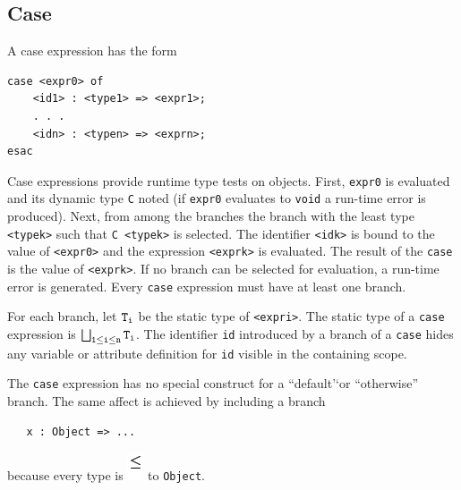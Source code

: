\documentclass[]{article}
\begin{document}
\subsection{Case}

A case expression has the form

\begin{verbatim}
case <expr0> of 
    <id1> : <type1> => <expr1>; 
    . . .
    <idn> : <typen> => <exprn>; 
esac
\end{verbatim}

Case expressions provide runtime type tests on objects. First,
\texttt{expr0} is evaluated and its dynamic type \texttt{C} noted (if
\texttt{expr0} evaluates to \texttt{void} a run-time error is produced).
Next, from among the branches the branch with the least type
\texttt{\textless{}typek\textgreater{}} such that
\texttt{C  \textless{}typek\textgreater{}} is selected. The identifier
\texttt{\textless{}idk\textgreater{}} is bound to the value of
\texttt{\textless{}expr0\textgreater{}} and the expression
\texttt{\textless{}exprk\textgreater{}} is evaluated. The result of the
\texttt{case} is the value of \texttt{\textless{}exprk\textgreater{}}.
If no branch can be selected for evaluation, a run-time error is
generated. Every \texttt{case} expression must have at least one branch.

For each branch, let $\tt T_i$ be the static type of
\texttt{\textless{}expri\textgreater{}}. The static type of a
\texttt{case} expression is $\tt\bigsqcup_{1 \leq i \leq
n} T_i$. The identifier \texttt{id} introduced by a branch of a
\texttt{case} hides any variable or attribute definition for \texttt{id}
visible in the containing scope.

The \texttt{case} expression has no special construct for a
``default'`or ``otherwise'' branch. The same affect is achieved by
including a branch

\begin{verbatim}
   x : Object => ...
\end{verbatim}

because every type is \includegraphics{img22.png} to \texttt{Object}.
\end{document}
